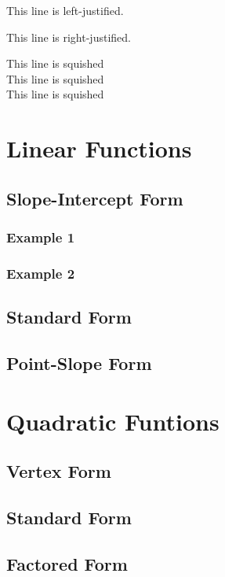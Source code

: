 \documentclass[11pt]{article}
\begin{document}
  \begin{flushleft}This line is left-justified.\end{flushleft}

  \begin{flushright}This line is right-justified.\end{flushright}

  \tiny
  This line is squished\\
  This line is squished\\
  This line is squished

  \section{Linear Functions}
    \subsection{Slope-Intercept Form}
      \subsubsection{Example 1}
      \subsubsection{Example 2}
    \subsection{Standard Form}
    \subsection{Point-Slope Form}
  \section{Quadratic Funtions}
    \subsection{Vertex Form}
    \subsection{Standard Form}
    \subsection{Factored Form}
\end{document}
